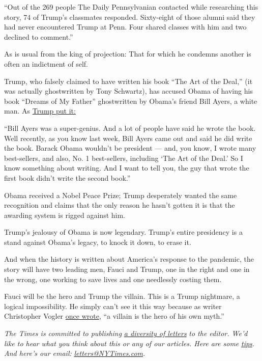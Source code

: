 ``Out of the 269 people The Daily Pennsylvanian contacted while
researching this story, 74 of Trump's classmates responded. Sixty-eight
of those alumni said they had never encountered Trump at Penn. Four
shared classes with him and two declined to comment.''

As is usual from the king of projection: That for which he condemns
another is often an indictment of self.

Trump, who falsely claimed to have written his book ``The Art of the
Deal,'' (it was actually ghostwritten by Tony Schwartz), has accused
Obama of having his book ``Dreams of My Father'' ghostwritten by Obama's
friend Bill Ayers, a white man. As
\href{https://www.huffpost.com/entry/donald-trump-bill-ayers_n_57e0220de4b04a1497b5ca8f?guccounter=1\&guce_referrer=aHR0cHM6Ly93d3cuZ29vZ2xlLmNvbS8\&guce_referrer_sig=AQAAAGl3RCEp7h2PcIUKjr9AbRcAH9kPAspRVeZwTGGh3FtLNjnUrQWzrMioFdXowlH0UYzSxOlNYzpaNN_uUuuBeP0AdvQ8DxqURqt7OaOsOomlud8ePuEhUx3CypWcnBqrjtUXhn7STBenh5UHWKLCQAfugFk1iINeMW5BOWZyQ6qV}{Trump
put it:}

``Bill Ayers was a super-genius. And a lot of people have said he wrote
the book. Well recently, as you know last week, Bill Ayers came out and
said he did write the book. Barack Obama wouldn't be president --- and,
you know, I wrote many best-sellers, and also, No. 1 best-sellers,
including `The Art of the Deal.' So I know something about writing. And
I want to tell you, the guy that wrote the first book didn't write the
second book.''

Obama received a Nobel Peace Prize; Trump desperately wanted the same
recognition and claims that the only reason he hasn't gotten it is that
the awarding system is rigged against him.

Trump's jealousy of Obama is now legendary. Trump's entire presidency is
a stand against Obama's legacy, to knock it down, to erase it.

And when the history is written about America's response to the
pandemic, the story will have two leading men, Fauci and Trump, one in
the right and one in the wrong, one working to save lives and one
needlessly costing them.

Fauci will be the hero and Trump the villain. This is a Trump nightmare,
a logical impossibility. He simply can't see it this way because as
writer Christopher Vogler
\href{http://craftywriters.club/reading/christopher-vogler-the-writers-journey.pdf}{once
wrote}, ``a villain is the hero of his own myth.''

\emph{The Times is committed to publishing}
\href{https://www.nytimes3xbfgragh.onion/2019/01/31/opinion/letters/letters-to-editor-new-york-times-women.html}{\emph{a
diversity of letters}} \emph{to the editor. We'd like to hear what you
think about this or any of our articles. Here are some}
\href{https://help.nytimes3xbfgragh.onion/hc/en-us/articles/115014925288-How-to-submit-a-letter-to-the-editor}{\emph{tips}}\emph{.
And here's our email:}
\href{mailto:letters@NYTimes.com}{\emph{letters@NYTimes.com}}\emph{.}

